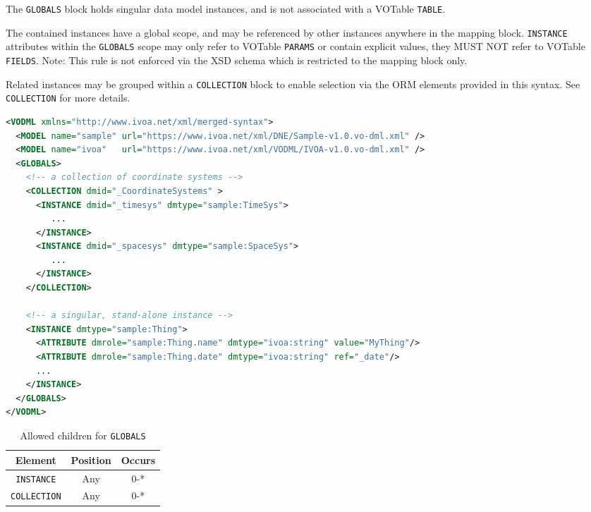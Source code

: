 The \texttt{GLOBALS} block holds singular data model instances, and is not associated 
with a VOTable \texttt{TABLE}.

The contained instances have a global scope, and may be
referenced by other instances anywhere in the mapping block.  \texttt{INSTANCE} attributes
within the \texttt{GLOBALS} scope may only refer to VOTable \texttt{PARAMS} or contain
explicit values, they MUST NOT refer to VOTable \texttt{FIELDS}.  Note: This rule is not enforced
via the XSD schema which is restricted to the mapping block only.

Related instances may be grouped within a \texttt{COLLECTION} block to enable selection
via the ORM elements provided in this syntax.  See \texttt{COLLECTION} for more details.

\begin{lstlisting}[caption={Example \texttt{GLOBALS} block},language=XML]
<VODML xmlns="http://www.ivoa.net/xml/merged-syntax">
  <MODEL name="sample" url="https://www.ivoa.net/xml/DNE/Sample-v1.0.vo-dml.xml" />
  <MODEL name="ivoa"   url="https://www.ivoa.net/xml/VODML/IVOA-v1.0.vo-dml.xml" />
  <GLOBALS>
    <!-- a collection of coordinate systems -->
    <COLLECTION dmid="_CoordinateSystems" >
      <INSTANCE dmid="_timesys" dmtype="sample:TimeSys">
         ...
      </INSTANCE>
      <INSTANCE dmid="_spacesys" dmtype="sample:SpaceSys">
         ...
      </INSTANCE>
    </COLLECTION>

    <!-- a singular, stand-alone instance -->
    <INSTANCE dmtype="sample:Thing">
      <ATTRIBUTE dmrole="sample:Thing.name" dmtype="ivoa:string" value="MyThing"/>
      <ATTRIBUTE dmrole="sample:Thing.date" dmtype="ivoa:string" ref="_date"/>
      ...
    </INSTANCE>
  </GLOBALS>
</VODML>
\end{lstlisting}


\begin{table}[!htbp]
  \small
  \centering
  \begin{tabulary}{\linewidth}{|c |c |c|}
    \hline 
        \textbf{Element} &
        \textbf{Position} &
        \textbf{Occurs}\\
    \hline
    \hline
        \texttt{INSTANCE} &
        Any &
        0-*\\
    \hline
        \texttt{COLLECTION} &
        Any &
        0-*\\
    \hline
  \end{tabulary}
  \caption{Allowed children for \texttt{GLOBALS}} 
  \label{tbl:globals-children}
 \end{table}
